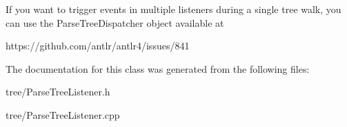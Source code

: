 If you want to trigger events in multiple listeners during a single tree walk, you can use the Parse\+Tree\+Dispatcher object available at \begin{DoxyVerb}https://github.com/antlr/antlr4/issues/841\end{DoxyVerb}
 

The documentation for this class was generated from the following files\+:\begin{DoxyCompactItemize}
\item 
tree/Parse\+Tree\+Listener.\+h\item 
tree/Parse\+Tree\+Listener.\+cpp\end{DoxyCompactItemize}
